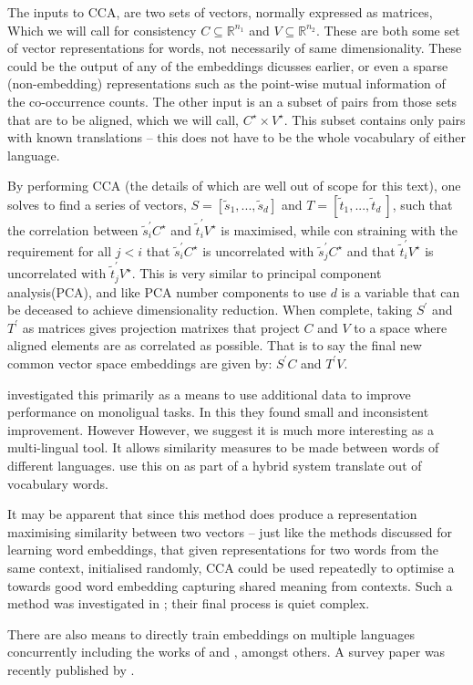 \documentclass[parskip]{komatufte}
\begin{document}
The inputs to CCA, are two sets of vectors, normally expressed as matrices,
Which we will call for consistency $C \subseteq \mathbb{R}^{n_1}$ and $V \subseteq \mathbb{R}^{n_2}$.
These are both some set of vector representations for words, not necessarily of same dimensionality.
These could be the output of any of the embeddings dicusses earlier,
or even a sparse (non-embedding) representations such as the point-wise mutual information of the co-occurrence counts.
The other input is an a subset of pairs from those sets that are to be aligned, which we will call, $C^\star \times V^\star$.
This subset contains only pairs with known translations -- this does not have to be the whole vocabulary of either language.


%
By performing CCA (the details of which are well out of scope for this text),
one solves to find a series of vectors, $S=\left[ \tilde{s}_1, ..., \tilde{s}_d \right]$ and $T= \left[ \tilde{t}_1, ..., \tilde{t}_d\ \right]$,
such that the correlation between $\tilde{s}_i^\prime C^\star$ and $\tilde{t}_i^\prime V^\star$ is maximised,
while con straining with the requirement for all $j<i$ that $\tilde{s}_i^\prime C^\star$ is uncorrelated with $\tilde{s}_j^\prime C^\star$  and that  $\tilde{t}_i^\prime V^\star$ is uncorrelated with $\tilde{t}_j^\prime V^\star$.
This is very similar to principal component analysis(PCA), and like PCA number components to use $d$ is a variable that can be deceased to achieve dimensionality reduction.
When complete, taking $S^\prime$ and $T^\prime$ as matrices gives projection matrixes that project $C$ and $V$ to a space where aligned elements are as correlated as possible.
That is to say the final new common vector space embeddings are given by:
$S^\prime C$ and $T^\prime V$.

\textcite{faruqui2014improving} investigated this primarily as a means to use additional data to improve performance on monoligual tasks.
In this they found small and inconsistent improvement.
However
However, we suggest it is much more interesting as a multi-lingual tool.
It allows similarity measures to be made between words of different languages.
 use this on as part of a hybrid system translate out of vocabulary words.



It may be apparent that since this method does produce a representation maximising similarity between two vectors -- just like the methods discussed for learning word embeddings,
that given representations for two words from the same context, initialised randomly,
CCA could be used repeatedly to optimise a towards good word embedding capturing shared meaning from contexts.
Such a method was investigated in ; their final process is quiet complex.


There are also means to directly train embeddings on multiple languages concurrently including the works of  and , amongst others.
A survey paper was recently published by \textcite{Ruder17crosslingreview}.
\end{document}
